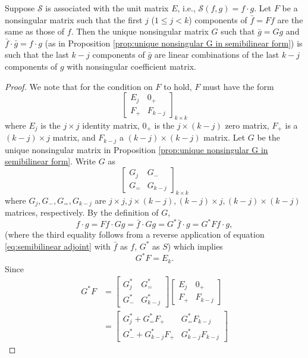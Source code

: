 \documentclass[12pt, oneside, a4paper]{article}
\begin{document}
\begin{prop}\cite[p.287]{CoddingtonLevinson}\label{prop:last k-j components linear combination}
    Suppose $\mathcal{S}$ is associated with the unit matrix $E$, i.e., $\mathcal{S}(f,g)=f\cdot g$. Let $F$ be a nonsingular matrix such that the first $j$ ($1\leq j<k$) components of $\bar{f}=Ff$ are the same as those of $f$. Then the unique nonsingular matrix $G$ such that $\bar{g}=Gg$ and $\bar{f}\cdot \bar{g}=f\cdot g$ (as in Proposition \ref{prop:unique nonsingular G in semibilinear form}) is such that the last $k-j$ components of $\bar{g}$ are linear combinations of the last $k-j$ components of $g$ with nonsingular coefficient matrix.
\end{prop}
\begin{proof}
    We note that for the condition on $F$ to hold, $F$ must have the form
\[\begin{bmatrix}E_j & 0_+\\
F_+ & F_{k-j}\end{bmatrix}_{k\times k}\]
where $E_j$ is the $j\times j$ identity matrix, $0_+$ is the $j\times (k-j)$ zero matrix, $F_+$ is a $(k-j)\times j$ matrix, and $F_{k-j}$ a $(k-j)\times (k-j)$ matrix. Let $G$ be the unique nonsingular matrix in Proposition \ref{prop:unique nonsingular G in semibilinear form}. Write $G$ as
\[\begin{bmatrix}G_j & G_-\\
G_= & G_{k-j}\end{bmatrix}_{k\times k}\]
where $G_j, G_-, G_=, G_{k-j}$ are $j\times j, j\times (k-j), (k-j)\times j, (k-j)\times (k-j)$ matrices, respectively. By the definition of $G$,
\[f\cdot g = Ff\cdot Gg = \bar{f}\cdot Gg = G^*\bar{f}\cdot g = G^*Ff\cdot g,\]
(where the third equality follows from a reverse application of equation \eqref{eq:semibilinear adjoint} with $\bar{f}$ as $f$, $G^*$ as $S$) which implies
\[G^*F = E_k.\]
Since
\begin{align*}
    G^*F &= \begin{bmatrix}
        G^*_j & G^*_=\\
        G^*_- & G^*_{k-j}
    \end{bmatrix}\begin{bmatrix}E_j & 0_+\\
    F_+ & F_{k-j}\end{bmatrix}\\
    &= \begin{bmatrix}
        G^*_j + G^*_= F_+ & G^*_= F_{k-j}\\
        G^*_- + G^*_{k-j} F_+ & G^*_{k-j}F_{k-j}

\end{bmatrix}
\end{align*}
\end{proof}
\end{document}
